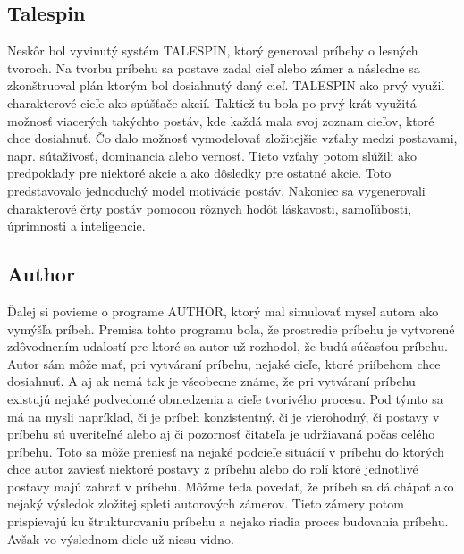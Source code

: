 \subsection{Talespin}
Neskôr bol vyvinutý systém TALESPIN\cite{talespin}, ktorý generoval príbehy o lesných tvoroch. Na tvorbu príbehu sa postave zadal cieľ alebo zámer a následne sa zkonštruoval plán ktorým bol dosiahnutý daný cieľ. TALESPIN ako prvý využil charakterové cieľe ako spúšťače akcií. Taktiež tu bola po prvý krát využitá možnosť viacerých takýchto postáv, kde každá mala svoj zoznam cieľov, ktoré chce dosiahnuť. Čo dalo možnosť vymodelovať zložitejšie vzťahy medzi postavami, napr. sútaživosť, dominancia alebo vernosť. Tieto vzťahy potom slúžili ako predpoklady pre niektoré akcie a ako dôsledky pre ostatné akcie. Toto predstavovalo jednoduchý model motivácie postáv. Nakoniec sa vygenerovali charakterové črty postáv pomocou rôznych hodôt láskavosti, samoľúbosti, úprimnosti a inteligencie.\par
\subsection{Author}
Ďalej si povieme o programe AUTHOR\cite{author}, ktorý mal simulovať myseľ autora ako vymýšľa príbeh. Premisa tohto programu bola, že prostredie príbehu je vytvorené zdôvodnením udalostí pre ktoré sa autor už rozhodol, že budú súčasťou príbehu. Autor sám môže mať, pri vytváraní príbehu, nejaké cieľe, ktoré priíbehom chce dosiahnuť. A aj ak nemá tak je všeobecne známe, že pri vytváraní príbehu existujú nejaké podvedomé obmedzenia a cieľe tvorivého procesu. Pod týmto sa má na mysli napríklad, či je príbeh konzistentný, či je vierohodný, či postavy v príbehu sú uveriteľné alebo aj či pozornosť čitateľa je udržiavaná počas celého príbehu. Toto sa môže preniesť na nejaké podcieľe situácií v príbehu do ktorých chce autor zaviesť niektoré postavy z príbehu alebo do rolí ktoré jednotlivé postavy majú zahrať v príbehu. Môžme teda povedať, že príbeh sa dá chápať ako nejaký výsledok zložitej spleti autorových zámerov. Tieto zámery potom prispievajú ku štrukturovaniu príbehu a nejako riadia proces budovania príbehu. Avšak vo výslednom diele už niesu vidno.\par
